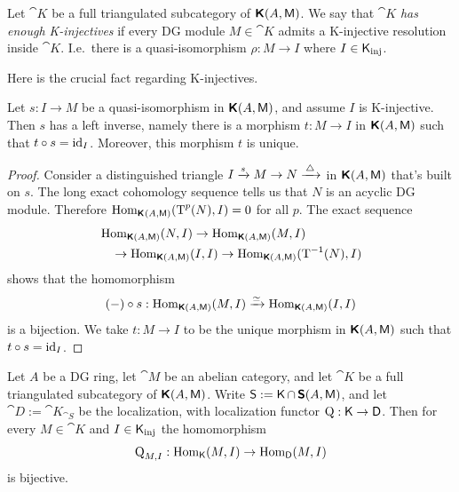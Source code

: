 \begin{dfn} \label{dfn:1508}
Let $\cat{K}$ be a full triangulated subcategory of 
$\boldsymbol{\mathsf{K}}(A, \operatorname{\mathsf{M}})$. We say that $\cat{K}$ 
{\em has enough K-injectives}%
if every DG module $M \in \cat{K}$ admits a K-injective resolution inside 
$\cat{K}$. I.e.\ there is a quasi-isomorphism $\rho : M \to I$
where $I \in \operatorname{\mathsf{K}}_{\mathrm{inj}}$.
\end{dfn}

Here is the crucial fact regarding K-injectives. 

\begin{lem} \label{lem:1510}
Let  $s : I \to M$ be a quasi-isomorphism in $\boldsymbol{\mathsf{K}}(A, \operatorname{\mathsf{M}})$,
and assume $I$ is K-injective. Then $s$ has a left inverse, namely 
there is a morphism $t : M \to I$ in $\boldsymbol{\mathsf{K}}(A, \operatorname{\mathsf{M}})$ such that 
$t \circ s = \operatorname{id}_{I}$. 
Moreover, this morphism $t$ is unique. 
\end{lem}

\begin{proof}
Consider a distinguished triangle 
$I \xrightarrow{s} M \to N \xrightarrow{\, \triangle \, }$
in $\boldsymbol{\mathsf{K}}(A, \operatorname{\mathsf{M}})$ that's built on $s$. The long exact 
cohomology sequence tells us that $N$ is an acyclic DG module. 
Therefore
$\operatorname{Hom}_{\boldsymbol{\mathsf{K}}^{}(A, \operatorname{\mathsf{M}})}(\operatorname{T}^p(N), I) = 0$ 
for all $p$. 
The exact sequence 
\[ \begin{aligned}
& \operatorname{Hom}_{\boldsymbol{\mathsf{K}}(A, \operatorname{\mathsf{M}})}(N, I) \to 
\operatorname{Hom}_{\boldsymbol{\mathsf{K}}(A, \operatorname{\mathsf{M}})}(M, I)
\\
& \quad 
\to \operatorname{Hom}_{\boldsymbol{\mathsf{K}}(A, \operatorname{\mathsf{M}})}(I, I) 
\to \operatorname{Hom}_{\boldsymbol{\mathsf{K}}(A, \operatorname{\mathsf{M}})}(\operatorname{T}^{-1}(N), I) 
\end{aligned} \]
shows that the homomorphism
\[ (-) \circ s : \operatorname{Hom}_{\boldsymbol{\mathsf{K}}(A, \operatorname{\mathsf{M}})}(M, I) \xrightarrow{\simeq} 
\operatorname{Hom}_{\boldsymbol{\mathsf{K}}(A, \operatorname{\mathsf{M}})}(I, I) \]
is a bijection.
We take $t : M \to I$ to be the unique morphism in $\boldsymbol{\mathsf{K}}(A, \operatorname{\mathsf{M}})$
such that $t \circ s = \operatorname{id}_I$. 
\end{proof}

\begin{thm} \label{thm:3135}
Let $A$ be a DG ring, let $\cat{M}$ be an abelian category, and let
$\cat{K}$ be a full triangulated subcategory of $\boldsymbol{\mathsf{K}}(A, \operatorname{\mathsf{M}})$.
Write $\operatorname{\mathsf{S}} := \operatorname{\mathsf{K}} \cap \, \boldsymbol{\mathsf{S}}(A, \operatorname{\mathsf{M}})$,
and let $\cat{D} := \cat{K}_{\cat{S}}$ be the localization, with localization 
functor $\operatorname{Q} : \operatorname{\mathsf{K}} \to \operatorname{\mathsf{D}}$. 
Then for every $M \in \cat{K}$ and $I \in \operatorname{\mathsf{K}}_{\mathrm{inj}}$
the homomorphism  
\[ \operatorname{Q}_{M, I} : \operatorname{Hom}_{\operatorname{\mathsf{K}}}(M, I) \to \operatorname{Hom}_{\operatorname{\mathsf{D}}}(M, I) \]
is bijective.  
\end{thm}


